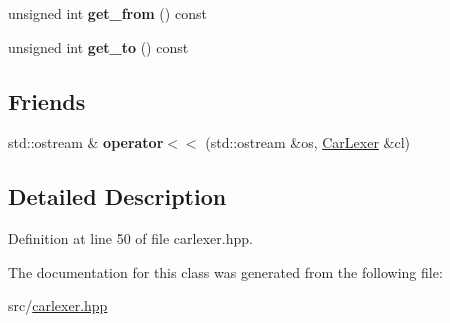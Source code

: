 \begin{DoxyCompactItemize}
\item 
\hypertarget{classjustine_1_1robocar_1_1CarLexer_a10ccec79e665a0fa52a3c53b30a0a76c}{unsigned int {\bfseries get\-\_\-from} () const }\label{classjustine_1_1robocar_1_1CarLexer_a10ccec79e665a0fa52a3c53b30a0a76c}

\item 
\hypertarget{classjustine_1_1robocar_1_1CarLexer_a8991b70b12f6db425c66f42bb5043418}{unsigned int {\bfseries get\-\_\-to} () const }\label{classjustine_1_1robocar_1_1CarLexer_a8991b70b12f6db425c66f42bb5043418}

\end{DoxyCompactItemize}
\subsection*{Friends}
\begin{DoxyCompactItemize}
\item 
\hypertarget{classjustine_1_1robocar_1_1CarLexer_ad3dfd377825cf79a0ef131deac8158c1}{std\-::ostream \& {\bfseries operator$<$$<$} (std\-::ostream \&os, \hyperlink{classjustine_1_1robocar_1_1CarLexer}{Car\-Lexer} \&cl)}\label{classjustine_1_1robocar_1_1CarLexer_ad3dfd377825cf79a0ef131deac8158c1}

\end{DoxyCompactItemize}


\subsection{Detailed Description}


Definition at line 50 of file carlexer.\-hpp.



The documentation for this class was generated from the following file\-:\begin{DoxyCompactItemize}
\item 
src/\hyperlink{carlexer_8hpp}{carlexer.\-hpp}\end{DoxyCompactItemize}
